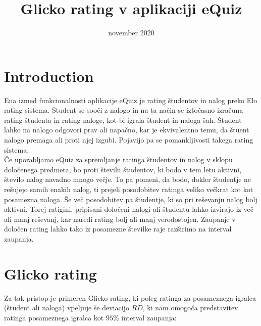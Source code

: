\documentclass{IEEEtran}
\title{Glicko rating v aplikaciji eQuiz}
\date{november 2020}
\begin{document}
\maketitle

\section{Introduction}
\label{sec:intro}
Ena izmed funkcionalnosti aplikacije eQuiz %
je rating študentov in nalog preko Elo rating sistema. Študent se sooči z nalogo in na ta način se iztočasno izračuna rating študenta in rating naloge, kot bi igrala študent in naloga šah. Študent lahko na nalogo odgovori prav ali napačno, kar je ekvivalentno temu, da štuent nalogo premaga ali proti njej izgubi. 
Pojavijo pa se pomankljivosti takega rating sistema. 
\hfill
\\
Če uporabljamo eQuiz za spremljanje ratinga študentov in nalog v sklopu določenega predmeta, bo proti številu študentov, ki bodo v tem letu aktivni, število nalog navadno mnogo večje. To pa pomeni, da bodo, dokler študentje ne rešujejo samih enakih nalog, ti prejeli posodobitev ratinga veliko večkrat kot kot posamezna naloga. Še več posodobitev pa študentje, ki so pri reševanju nalog bolj aktivni.
Torej ratigini, pripisani določeni nalogi ali študentu lahko izvirajo iz več ali manj reševanj, kar naredi rating bolj ali manj verodostojen.
Zaupanje v določen rating lahko tako iz posamezne številke raje razširimo na interval zaupanja.
\section{Glicko rating}
\label{sec:glicko}
Za tak pristop je primeren Glicko %
rating, ki poleg ratinga za posameznega igralca (študent ali naloga) vpeljuje še deviacijo $RD$, ki nam omogoča predstavitev ratinga posameznega igralca kot $95\%$ interval zaupanja:
\end{document}
